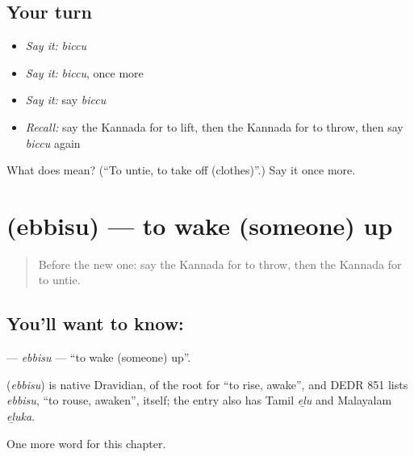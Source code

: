 \subsection*{Your turn}
\begin{itemize}
\raggedright
  \item \emph{Say it:} \emph{biccu}
  \item \emph{Say it:} \emph{biccu}, once more
  \item \emph{Say it:} say \emph{biccu}
  \item \emph{Recall:} say the Kannada for to lift, then the Kannada for to throw, then say \emph{biccu} again
\end{itemize}

\begin{tcolorbox}[breakable,colback=teal!4,colframe=teal!35!black,title={Before you move on}]
What does  mean? (\textquotedblleft{}To untie, to take off (clothes)\textquotedblright{}.) Say it once more.
\end{tcolorbox}
\section[\texorpdfstring{\kn{ಎಬ್ಬಿಸು} (ebbisu)}{ಎಬ್ಬಿಸು (ebbisu)}]{ (ebbisu) — to wake (someone) up}

\label{lesson:KA-C236-ebbisu}



\begin{quote}
Before the new one: say the Kannada for to throw, then the Kannada for to untie.
\end{quote}

\subsection*{You'll want to know: }
\textbf{} — \emph{ebbisu} — \textquotedblleft{}to wake (someone) up\textquotedblright{}.

\begin{cousinweb}
\textbf{} (\emph{ebbisu}) is native Dravidian, of the root for \textquotedblleft{}to rise, awake\textquotedblright{}, and DEDR 851 lists \emph{ebbisu}, \textquotedblleft{}to rouse, awaken\textquotedblright{}, itself; the entry also has Tamil \emph{eḻu} and Malayalam \emph{eḻuka}.
\end{cousinweb}

\begin{grammarlens}[title={What you've built}]
One more word for this chapter.
\end{grammarlens}


